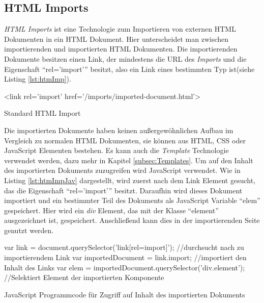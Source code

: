 \documentclass[12pt, paper=a4, bibtotoc, toc=listof, headsepline=true, numbers=endperiod]{scrreprt}
\begin{document}
		\subsection{HTML Imports}
		\emph{\ac{HTML} Imports} ist eine Technologie zum Importieren von externen \ac{HTML} Dokumenten in ein \ac{HTML} Dokument. Hier unterscheidet man zwischen importierenden und importierten \ac{HTML} Dokumenten. Die importierenden Dokumente besitzen einen Link, der mindestens die \ac{URL} des \emph{Imports} und die Eigenschaft \enquote{rel='import'} besitzt, also ein Link eines bestimmten Typ ist\cite{Glazkov2016}(siehe Listing \ref{lst:htmImp}). 
		\begin{listing}
			\begin{HTMLcode*}{}
 <link rel='import' href='/imports/imported-document.html'>
				\end{HTMLcode*}
			\caption{Standard HTML Import}
			\label{lst:htmImp}
		\end{listing}
		Die importierten Dokumente haben keinen außergewöhnlichen Aufbau im Vergleich zu normalen \ac{HTML} Dokumenten, sie können aus \ac{HTML}, \ac{CSS} oder JavaScript Elementen bestehen. Es kann auch die \emph{Template} Technologie verwendet werden, dazu mehr in Kapitel \ref{subsec:Templates}.
		Um auf den Inhalt des importierten Dokuments zuzugreifen wird JavaScript verwendet. Wie in Listing \ref{lst:htmImpJav} dargestellt, wird zuerst nach dem Link Element gesucht, das die Eigenschaft \enquote{rel='import'} besitzt. Daraufhin wird dieses Dokument importiert und ein bestimmter Teil des Dokuments als JavaScript Variable \enquote{elem} gespeichert. Hier wird ein \emph{div} Element, das mit der Klasse \enquote{element} ausgezeichnet ist, gespeichert. Anschließend kann dies in der importierenden Seite genutzt werden. 
		\begin{listing}
			\begin{JavaScriptcode*}{}
var link = document.querySelector('link[rel=import]'); //durchsucht nach zu importierendem Link
var importedDocument = link.import; //importiert den Inhalt des Links
var elem = importedDocument.querySelector('div.element');  //Selektiert Element der importierten Komponente
			\end{JavaScriptcode*}
			\caption[Zugriff auf importiertes Dokument]{JavaScript Programmcode für Zugriff auf Inhalt des importierten Dokuments}
			\label{lst:htmImpJav}
		\end{listing} 
\end{document}
